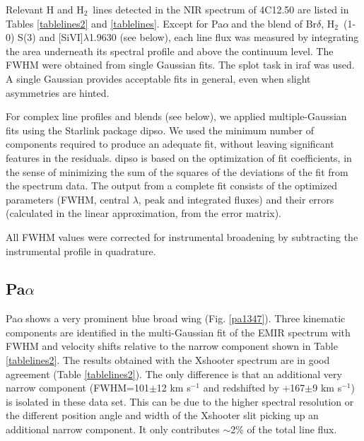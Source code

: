 \documentclass{aa}
\newcommand{\pa}{Pa$\alpha~$}
\newcommand{\hmol}{H$_2$~}
\begin{document}
Relevant  H and \hmol  lines detected in the NIR spectrum of 4C12.50 are listed in  Tables \ref{tablelines2} and \ref{tablelines}.  
Except for \pa and the blend of Br$\delta$, \hmol(1-0) S(3) and [SiVI]$\lambda$1.9630 (see below), each line flux  was measured by   integrating the area underneath its spectral  profile and above the continuum level. The FWHM  were obtained from  single Gaussian fits. The {\sc splot} task in {\sc iraf} was used. A single Gaussian  provides acceptable fits in general, even when  slight asymmetries are hinted. 

For complex line profiles  and blends  (see below),
 we applied  multiple-Gaussian fits using the {\sc Starlink} package {\sc dipso}. We used the minimum number of components required to produce an adequate fit, without leaving significant features in the residuals.
{\sc dipso} 
is based on the optimization of fit coefficients, in the sense of minimizing the sum of the squares
of the deviations of the fit from the spectrum data.  The output from a complete fit consists of the optimized parameters (FWHM, central $\lambda$, peak and integrated fluxes) and their
errors (calculated in the linear approximation, from the error matrix). 

All FWHM values  were corrected for instrumental broadening
by subtracting the instrumental profile in quadrature.



\subsection{\pa}
\label{secpa}

\pa  shows a very prominent blue broad wing  (Fig. \ref{pa1347}). 
Three kinematic components are identified in the multi-Gaussian fit of the EMIR spectrum   with FWHM and velocity shifts relative to the narrow component shown in Table \ref{tablelines2}. The results obtained  with the Xshooter spectrum are in good agreement (Table \ref{tablelines2}). The only difference  is that an additional very narrow  component (FWHM=101$\pm$12 km s$^{-1}$  and redshifted by +167$\pm$9 km s$^{-1}$) is isolated in these data set. This can be due to  the higher spectral resolution or the different  position angle and width of the Xshooter slit picking up an additional narrow component.  It only contributes $\sim$2\% of the total line flux. 
\end{document}
